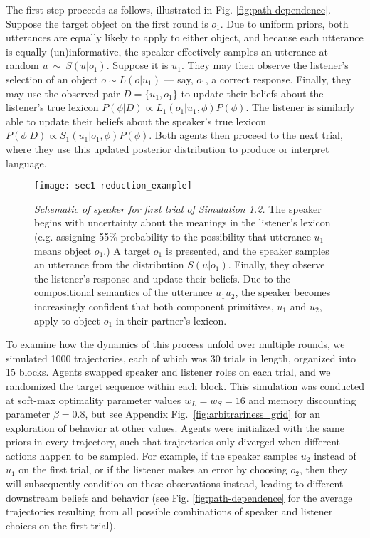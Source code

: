 The first step proceeds as follows, illustrated in Fig. \ref{fig:path-dependence}.
Suppose the target object on the first round is $o_1$.
Due to uniform priors, both utterances are equally likely to apply to either object, and because each utterance is equally (un)informative, the speaker effectively samples an utterance at random $u~\sim~S(u|o_1)$.
Suppose it is $u_1$.
They may then observe the listener's selection of an object $o \sim L(o | u_1)$ --- say, $o_1$, a correct response.
Finally, they may use the observed pair $D = \{u_1, o_1\}$ to update their beliefs about the listener's true lexicon $P(\phi | D)\propto L_1(o_1 | u_1, \phi)P(\phi)$.
The listener is similarly able to update their beliefs about the speaker's true lexicon $P(\phi | D)\propto S_1(u_1 | o_1, \phi)P(\phi)$. 
Both agents then proceed to the next trial, where they use this updated posterior distribution to produce or interpret language.
\begin{figure*}
\centering
    \texttt{[image: sec1-reduction\_example]}
    \vspace{1em}
  \caption{\emph{Schematic of speaker for first trial of Simulation 1.2.} The speaker begins with uncertainty about the meanings in the listener's lexicon (e.g. assigning 55\% probability to the possibility that utterance $u_1$ means object $o_1$.) A target $o_1$ is presented, and the speaker samples an utterance from the distribution $S(u|o_1)$. Finally, they observe the listener's response and update their beliefs. Due to the compositional semantics of the utterance $u_1u_2$, the speaker becomes increasingly confident that both component primitives, $u_1$ and $u_2$, apply to object $o_1$ in their partner's lexicon.}
  \label{fig:sec1efficiency}
\end{figure*}

To examine how the dynamics of this process unfold over multiple rounds, we simulated 1000 trajectories, each of which was 30 trials in length, organized into 15 blocks.
Agents swapped speaker and listener roles on each trial, and we randomized the target sequence within each block.
This simulation was conducted at soft-max optimality parameter values $w_L = w_S = 16$ and memory discounting parameter $\beta = 0.8$, but see Appendix Fig.~\ref{fig:arbitrariness_grid} for an exploration of behavior at other values.
Agents were initialized with the same priors in every trajectory, such that trajectories only diverged when different actions happen to be sampled.
For example, if the speaker samples $u_2$ instead of $u_1$ on the first trial, or if the listener makes an error by choosing $o_2$, then they will subsequently condition on these observations instead, leading to different downstream beliefs and behavior (see Fig. \ref{fig:path-dependence} for the average trajectories resulting from all possible combinations of speaker and listener choices on the first trial).

